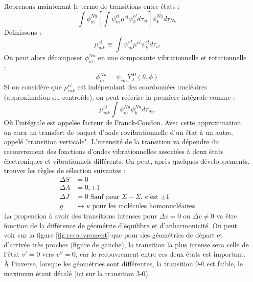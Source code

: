 Reprenons maintenant le terme de transitions entre états : 
\begin{equation*}
    \int \phi^{Nu}_m\left[\int \psi^{el}_m\mu^{el}\psi^{el}_kd\tau_{el} \right]\phi^{Nu}_kd\tau_{Nu}
\end{equation*}
Définissons : 
\begin{equation*}
    \mu^{el}_{mk} \equiv \int \psi^{el}_m\mu^{el}\psi^{el}_kd\tau_{el}
\end{equation*}
On peut alors décomposer $\phi_m^{Nu}$ en une composante vibrationnelle et rotationnelle :
\begin{equation*}
    \phi_m^{Nu} = \psi_{vm}Y_J^M(\theta,\phi)
\end{equation*}
Si on considère que $\mu^{el}_{mk}$ est indépendant des coordonnées nucléaires (approximation du centroïde), on peut réécrire la première intégrale comme :
\begin{equation*}
    \mu^{el}_{mk} \int \phi^{Nu}_m\phi^{Nu}_kd\tau_{Nu}
\end{equation*}
Où l'intégrale est appelée facteur de Franck-Condon. Avec cette approximation, on aura un transfert de paquet d'onde rovibrationnelle d'un état à un autre, appelé "transition verticale". L'intensité de la transition va dépendre du recouvrement des fonctions d'ondes vibrationnelles associées à deux états électroniques et vibrationnels différents. On peut, après quelques développements, trouver les règles de sélection suivantes : 
\begin{equation*}
    \begin{split}
        \Delta S &= 0\\
        \Delta\Lambda &= 0,\pm1\\
        \Delta J &= 0 \textrm{ Sauf pour $\Sigma-\Sigma$, c'est $\pm1$}\\
        g &\leftrightarrow u \textrm{ pour les molécules homonucléaires}
    \end{split}
\end{equation*}
La propension à avoir des transitions intenses pour $\Delta v = 0$ ou $\Delta v \neq 0$ va être fonction de la différence de géométrie d'équilibre et d'anharmonicité.\newline
On peut voir sur la figure \ref{fig:recouvrement} que pour des géométries de départ et d'arrivée très proches (figure de gauche), la transition la plus intense sera celle de l'état $v'=0$ vers $v''=0$, car le recouvrement entre ces deux états est important. À l'inverse, lorsque les géométries sont différentes, la transition 0-0 est faible, le maximum étant décalé (ici sur la transition 3-0).
